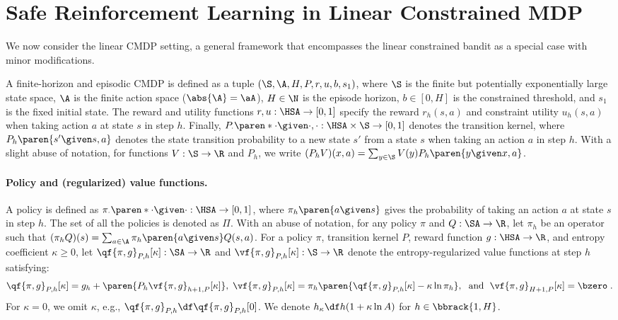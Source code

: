\section{Safe Reinforcement Learning in Linear Constrained MDP} \label{sec:MDP}

We now consider the linear CMDP setting, a general framework that encompasses the linear constrained bandit as a special case with minor modifications.

A finite-horizon and episodic CMDP is defined as a tuple $(\S, \A, H, P, r, u, b, s_1)$, where
$\S$ is the finite but potentially exponentially large state space,
$\A$ is the finite action space ($\abs{\A}=\aA$),
$H \in \N$ is the episode horizon,
$b \in [0, H]$ is the constrained threshold, 
and $s_1$ is the fixed initial state.
The reward and utility functions $r, u: \HSA \to [0, 1]$ specify the reward $r_h(s, a)$ and constraint utility $u_h(s, a)$ when taking action $a$ at state $s$ in step $h$.
Finally, $P_\cdot\paren*{\cdot\given \cdot, \cdot}: \HSA\times \S \to [0, 1]$ denotes the transition kernel, where $P_{h}\paren{s' \given s, a}$ denotes the state transition probability to a new state $s'$ from a state $s$ when taking an action $a$ in step $h$.
With a slight abuse of notation, for functions $V : \S \to \R$ and $P_h$, we write $(P_h V)(x, a) = \sum_{y\in \S} V(y) P_h \paren{y \given x, a}$.

\paragraph{Policy and (regularized) value functions.}
A policy is defined as $\pi_{\cdot}\paren*{\cdot\given\cdot} : \HSA \to [0,1]$, where $\pi_h \paren{a \given s}$ gives the probability of taking an action $a$ at state $s$ in step $h$.
The set of all the policies is denoted as $\Pi$.
With an abuse of notation, for any policy $\pi $ and $Q: \SA \to \R$, let $\pi_h$ be an operator such that $(\pi_h Q) (s) = \sum_{a \in \A} \pi_h\paren{a\given s} Q (s, a)$.
For a policy $\pi$, transition kernel $P$, reward function $g: \HSA \to \R$, and entropy coefficient $\kappa \geq 0$, let $\qf{\pi, g}_{P, h}[\kappa]: \SA \to \R$ and $\vf{\pi, g}_{P, h}[\kappa]: \S \to \R$ denote the entropy-regularized value functions at step $h$ satisfying:
\begin{align*}
\qf{\pi, g}_{P,h}[\kappa] = g_h + \paren{P_h\vf{\pi, g}_{h+1, P}[\kappa]},\; 
\vf{\pi, g}_{P, h}[\kappa] = \pi_h
    \paren{\qf{\pi, g}_{P,h}[\kappa] - \kappa \ln \pi_h },
\;\text{ and }\; \vf{\pi, g}_{H+1, P}[\kappa] = \bzero\;.
\end{align*}
For \(\kappa = 0\), we omit \(\kappa\), e.g., \(\qf{\pi, g}_{P, h} \df \qf{\pi, g}_{P, h}[0]\). We denote \(h_\kappa \df h(1 + \kappa \ln A)\) for $h \in \bbrack{1, H}$.

